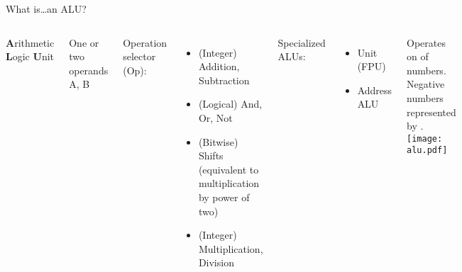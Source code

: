 \documentclass[english,compress]{beamer}
\begin{document}
\begin{frame}{What is\dots an ALU?}
  \begin{columns}

      \textbf{A}rithmetic \textbf{L}ogic \textbf{U}nit

      One or two operands A, B

      Operation selector (Op):
      \begin{itemize}
        \item (Integer) Addition, Subtraction
        \item (Logical) And, Or, Not
        \item (Bitwise) Shifts (equivalent to multiplication by power of
        two)
        \item (Integer) Multiplication, Division
      \end{itemize}

      Specialized ALUs:
      \begin{itemize}
        \item {} Unit (FPU)
        \item Address ALU
      \end{itemize}

      Operates on
       of numbers.
      Negative numbers represented by
      .
      \texttt{[image: alu.pdf]}
  \end{columns}
\end{frame}
\end{document}
